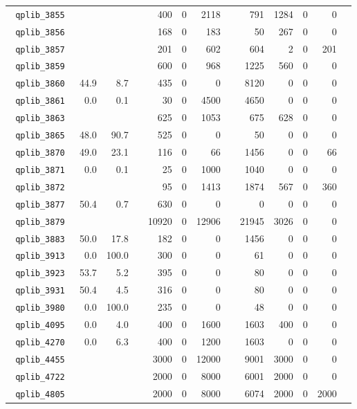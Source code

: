 {\begin{longtable}{lrrrrrrrrrrrr}
\texttt{ 	qplib\_3855	}	&		&		&	&	400	&	0	&	2118	&	&	791	&	1284	&	0	&	0	\\
\texttt{ 	qplib\_3856	}	&		&		&	&	168	&	0	&	183	&	&	50	&	267	&	0	&	0	\\
\texttt{ 	qplib\_3857	}	&		&		&	&	201	&	0	&	602	&	&	604	&	2	&	0	&	201	\\
\texttt{ 	qplib\_3859	}	&		&		&	&	600	&	0	&	968	&	&	1225	&	560	&	0	&	0	\\
\texttt{ 	qplib\_3860	}	&	44.9	&	8.7	&	&	435	&	0	&	0	&	&	8120	&	0	&	0	&	0	\\
\texttt{ 	qplib\_3861	}	&	0.0	&	0.1	&	&	30	&	0	&	4500	&	&	4650	&	0	&	0	&	0	\\
\texttt{ 	qplib\_3863	}	&		&		&	&	625	&	0	&	1053	&	&	675	&	628	&	0	&	0	\\
\texttt{ 	qplib\_3865	}	&	48.0	&	90.7	&	&	525	&	0	&	0	&	&	50	&	0	&	0	&	0	\\
\texttt{ 	qplib\_3870	}	&	49.0	&	23.1	&	&	116	&	0	&	66	&	&	1456	&	0	&	0	&	66	\\
\texttt{ 	qplib\_3871	}	&	0.0	&	0.1	&	&	25	&	0	&	1000	&	&	1040	&	0	&	0	&	0	\\
\texttt{ 	qplib\_3872	}	&		&		&	&	95	&	0	&	1413	&	&	1874	&	567	&	0	&	360	\\
\texttt{ 	qplib\_3877	}	&	50.4	&	0.7	&	&	630	&	0	&	0	&	&	0	&	0	&	0	&	0	\\
\texttt{ 	qplib\_3879	}	&		&		&	&	10920	&	0	&	12906	&	&	21945	&	3026	&	0	&	0	\\
\texttt{ 	qplib\_3883	}	&	50.0	&	17.8	&	&	182	&	0	&	0	&	&	1456	&	0	&	0	&	0	\\
\texttt{ 	qplib\_3913	}	&	0.0	&	100.0	&	&	300	&	0	&	0	&	&	61	&	0	&	0	&	0	\\
\texttt{ 	qplib\_3923	}	&	53.7	&	5.2	&	&	395	&	0	&	0	&	&	80	&	0	&	0	&	0	\\
\texttt{ 	qplib\_3931	}	&	50.4	&	4.5	&	&	316	&	0	&	0	&	&	80	&	0	&	0	&	0	\\
\texttt{ 	qplib\_3980	}	&	0.0	&	100.0	&	&	235	&	0	&	0	&	&	48	&	0	&	0	&	0	\\
\texttt{ 	qplib\_4095	}	&	0.0	&	4.0	&	&	400	&	0	&	1600	&	&	1603	&	400	&	0	&	0	\\
\texttt{ 	qplib\_4270	}	&	0.0	&	6.3	&	&	400	&	0	&	1200	&	&	1603	&	0	&	0	&	0	\\
\texttt{ 	qplib\_4455	}	&		&		&	&	3000	&	0	&	12000	&	&	9001	&	3000	&	0	&	0	\\
\texttt{ 	qplib\_4722	}	&		&		&	&	2000	&	0	&	8000	&	&	6001	&	2000	&	0	&	0	\\
\texttt{ 	qplib\_4805	}	&		&		&	&	2000	&	0	&	8000	&	&	6074	&	2000	&	0	&	2000	\\

\end{longtable}}
